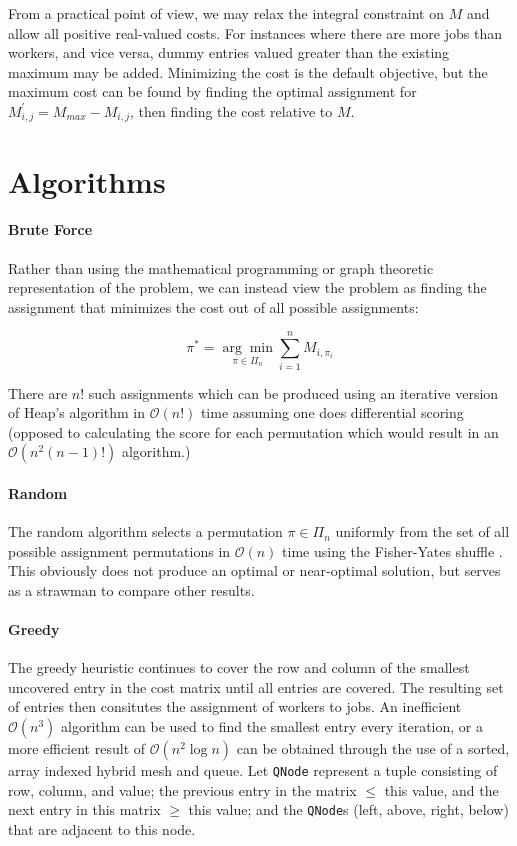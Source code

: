 \documentclass{article}
\newcommand{\boundedBy}[1]{\mathcal{O} \left ( #1 \right )}
\begin{document}
From a practical point of view, we may relax the integral constraint on $M$ and allow all positive real-valued costs. For instances where there are more jobs than workers, and vice versa, dummy entries valued greater than the existing maximum may be added. Minimizing the cost is the default objective, but the maximum cost can be found by finding the optimal assignment for $M^{\prime}_{i,j} = M_{max} - M_{i,j}$, then finding the cost relative to $M$. 

\section{Algorithms}

\paragraph{Brute Force}

Rather than using the mathematical programming or graph theoretic representation of the problem, we can instead view the problem as finding the assignment that minimizes the cost out of all possible assignments:

\begin{equation}
	\pi^{*} = \underset{\pi \in \Pi_n}{\arg\min} \sum_{i=1}^{n} M_{i, \pi_i}
\end{equation}

There are $n!$ such assignments which can be produced using an iterative version of Heap's algorithm \cite{heap1963permutations} in $\boundedBy{n!}$ time assuming one does differential scoring (opposed to calculating the score for each permutation which would result in an $\boundedBy{n^2 (n-1)!}$ algorithm.)

\paragraph{Random}

The random algorithm selects a permutation $\pi \in \Pi_n$ uniformly from the set of all possible assignment permutations in $\boundedBy{n}$ time using the Fisher-Yates shuffle \cite{durstenfeld1964algorithm}. This obviously does not produce an optimal or near-optimal solution, but serves as a strawman to compare other results.

\paragraph{Greedy}

The greedy heuristic continues to cover the row and column of the smallest uncovered entry in the cost matrix until all entries are covered. The resulting set of entries then consitutes the assignment of workers to jobs. An inefficient $\boundedBy{n^3}$ algorithm can be used to find the smallest entry every iteration, or a more efficient result of $\boundedBy{n^2 \log n}$ can be obtained through the use of a sorted, array indexed hybrid mesh and queue. Let \texttt{QNode} represent a tuple consisting of row, column, and value; the previous entry in the matrix $\le$ this value, and the next entry in this matrix $\ge$ this value; and the \texttt{QNode}s (left, above, right, below) that are adjacent to this node.
\end{document}
